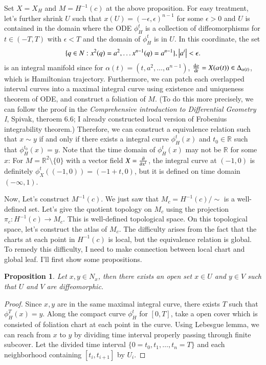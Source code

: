 \documentclass[a4paper, 12pt]{article}
\theoremstyle{Mydefinition}
\theoremstyle{Mytheorem}
\newtheorem{proposition}[statement]{Proposition}
\begin{document}
\begin{enumerate}
    Set $X=X_H$ and $M=H^{-1}(c)$ at the above proposition. For easy treatment, let's further shrink $U$ such that $x(U) = (-\epsilon, \epsilon)^{n-1}$ for some $\epsilon>0$ and $U$ is contained in the domain where the ODE $\phi^t_H$ is a collection of diffeomorphisms for $t\in (-T, T)$ with $\epsilon<T$ and the domain of $\phi^t_H$ is in $U$. In this coordinate, the set
    \begin{equation*}
        \{q\in N:x^2(q) = a^2, \ldots x^{n-1}(q) = a^{n-1}\}, \abs{a^i}<\epsilon.
    \end{equation*}
    is an integral manifold since for $\alpha(t) = (t, a^2, \ldots, a^{n-1})$, $\dv{\alpha}{t} = X(\alpha(t))\in \Delta_{\alpha(t)}$, which is Hamiltonian trajectory. Furthermore, we can patch each overlapped interval curves into a maximal integral curve using existence and uniqueness theorem of ODE, and construct a foliation of $M$. (To do this more precisely, we can follow the proof in the \textit{Comprehensive introduction to Differential Geometry I}, Spivak, theroem 6.6; I already constructed local version of Frobenius integrability theorem.) Therefore, we can construct a equivalence relation such that $x\sim y$ if and only if there exists a integral curve $\phi^{t}_H(x)$ and $t_0\in\mathbb{R}$ such that $\phi^{t_0}_H(x) = y$. Note that the time domain of $\phi^t_H(x)$ may not be $\mathbb{R}$ for some $x$: For $M = \mathbb{R}^2\setminus\{0\}$ with a vector field $X=\pdv{x^1}$, the integral curve at $(-1,0)$ is definitely $\phi^t_X((-1,0)) = (-1+t, 0)$, but it is defined on time domain $(-\infty, 1)$.
    
    Now, Let's construct $M^{-1}(c)$. We just saw that $M_c =H^{-1}(c)/\sim$ is a well-defined set. Let's give the quotient topology on $M_c$ using the projection $\pi_c:H^{-1}(c)\rightarrow M_c$. This is well-defined topological space. On this topological space, let's construct the atlas of $M_c$. The difficulty arises from the fact that the charts at each point in $H^{-1}(c)$ is local, but the equivalence relation is global. To remedy this difficulty, I need to make connection between local chart and global leaf. I'll first show some propositions.
    \begin{proposition}\label{HW7:Prop3}
        Let $x, y\in N_x$, then there exists an open set $x\in U$ and $y\in V$ such that $U$ and $V$ are diffeomorphic.
    \end{proposition}
    \begin{proof}
    Since $x,y$ are in the same maximal integral curve, there exists $T$ such that $\phi^{T}_H(x) = y$. Along the compact curve $\phi^t_H$ for $[0,T]$, take a open cover which is consisted of foliation chart at each point in the curve. Using Lebesgue lemma, we can reach from $x$ to $y$ by dividing time interval properly passing through finite subcover. Let the divided time interval $\{0=t_0, t_1, \ldots, t_n = T\}$ and each neighborhood containing $[t_i, t_{i+1}]$ by $U_i$.
    

\end{proof}
\end{enumerate}
\end{document}
